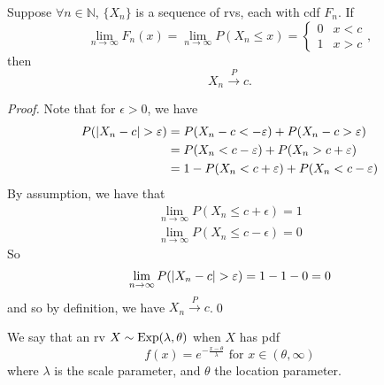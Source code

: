 \documentclass[notoc,notitlepage]{tufte-book}
\newcommand{\convp}{\overset{P}{\to}}
\begin{document}
\begin{propo}
\label{propo:partial_converse_of_convp_implies_convd}
  Suppose $\forall n \in \mathbb{N}$, $\{X_n\}$ is a sequence of rvs, each with cdf $F_n$. If
  \begin{equation*}
    \lim_{n \to \infty} F_n(x) = \lim_{n \to \infty} P( X_n \leq x ) = \begin{cases}
      0 & x < c \\
      1 & x > c
    \end{cases},
  \end{equation*}
  then
  \begin{equation*}
    X_n \convp c.
  \end{equation*}
\end{propo}

\begin{proof}
  Note that for $\epsilon > 0$, we have
  \begin{align*}
    P( \left|X_n - c\right| > \varepsilon ) &= P( X_n - c < -\varepsilon ) + P( X_n - c > \varepsilon ) \\
                                  &= P( X_n < c - \varepsilon ) + P( X_n > c + \varepsilon ) \\
                                  &= 1 - P( X_n < c + \varepsilon ) + P ( X_n < c - \varepsilon )
  \end{align*}
  By assumption, we have that
  \begin{gather*}
    \lim_{n \to \infty} P( X_n \leq c + \epsilon ) = 1 \\
    \lim_{n \to \infty} P( X_n \leq c - \epsilon ) = 0
  \end{gather*}
  So
  \begin{equation*}
    \lim_{n \to \infty} P(\left|X_n - c\right| > \varepsilon) = 1 - 1 - 0 = 0
  \end{equation*}
  and so by definition, we have $X_n \convp c$.\qed
\end{proof}

\begin{defn}
\label{defn:double_parameter_exponential_distribution}
We say that an rv $X \sim \operatorname{Exp}(\lambda, \theta)$ when $X$ has pdf
\begin{equation*}
  f(x) = e^{- \frac{x - \theta}{\lambda}} \text{ for } x \in (\theta, \infty)
\end{equation*}
where $\lambda$ is the scale parameter, and $\theta$ the location parameter.
\end{defn}
\end{document}
